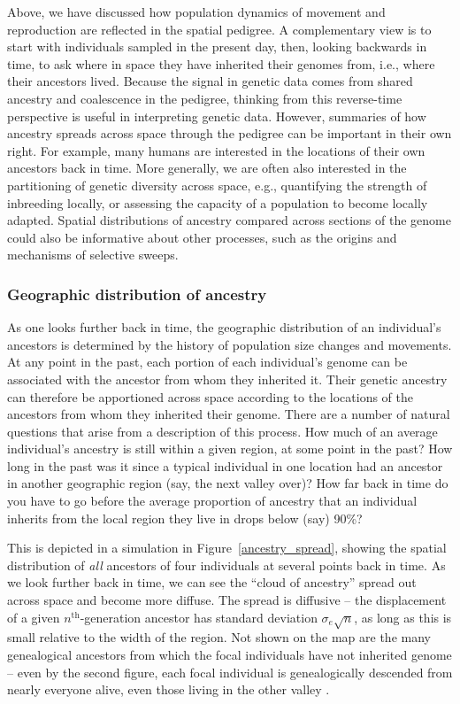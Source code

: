 \documentclass{ar-1col}
\begin{document}
Above, we have discussed how population dynamics of movement and reproduction
are reflected in the spatial pedigree.
A complementary view is to
start with individuals sampled in the present day,
then, looking backwards in time,
to ask where in space they have inherited their genomes from, 
i.e., where their ancestors lived.
Because the signal in genetic data comes from 
shared ancestry and coalescence in the pedigree,
thinking from this reverse-time perspective 
is useful in interpreting genetic data.
However, summaries of how ancestry spreads across space 
through the pedigree can be important in their own right.
For example, many humans are interested
in the locations of their own ancestors back in time.
More generally,
we are often also interested in the partitioning of genetic diversity across space,
e.g.,
quantifying the strength of inbreeding locally,
or assessing the capacity of a population to become locally adapted.
Spatial distributions of ancestry compared across sections of the genome
could also be informative about 
other processes, such as
the origins and mechanisms of selective sweeps.


\subsubsection{Geographic distribution of ancestry}

As one looks further back in time,
the geographic distribution of an individual's ancestors
is determined by the history of population size changes and movements.
At any point in the past,
each portion of each individual's genome can be associated 
with the ancestor from whom they inherited it.
Their genetic ancestry can therefore be apportioned across space according
to the locations of the ancestors from whom they inherited their genome.
There are a number of natural questions that arise from a description of this process.
How much of an average individual's ancestry is still within a given region, 
at some point in the past?
How long in the past was it since a typical individual in one location had an ancestor
in another geographic region (say, the next valley over)?
How far back in time do you have to go before 
the average proportion of ancestry that an individual inherits
from the local region they live in drops below (say) 90\%?

This is depicted in a simulation in Figure~\ref{ancestry_spread},
showing the spatial distribution of \textit{all} ancestors of four individuals
at several points back in time.
As we look further back in time,
we can see the ``cloud of ancestry'' spread out across space
and become more diffuse.
The spread is diffusive --
the displacement of a given $n^\text{th}$-generation ancestor 
has standard deviation $\sigma_e \sqrt{n}$,
as long as this is small relative to the width of the region.
Not shown on the map are the many genealogical ancestors
from which the focal individuals have not inherited genome --
even by the second figure,
each focal individual is genealogically descended from nearly everyone alive,
even those living in the other valley \citep{chang1999}.
\end{document}
